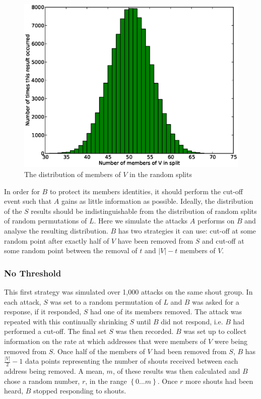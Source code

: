 \documentclass[ %
                    author={Luke Murray},
                supervisor={Dr. Simon Hollis},
                     title={Shadow Peer-to-Peer Networks},
                  subtitle={},
                    degree={MEng},
                      year={2013} ]{thesis}
\begin{document}
\begin{figure}[h]
    \centering
    \begin{minipage}[b]{0.6\linewidth}
        \centering
        \includegraphics[width=\linewidth]{diagrams/split_result.eps}
        \caption{The distribution of members of $V$ in the random splits}
    \end{minipage}
    \label{random_split_result}
\end{figure}

In order for $B$ to protect its members identities, it should perform the cut-off event such that $A$ gains as little information as possible. Ideally, the distribution of the $S$ results should be indistinguishable from the distribution of random splits of random permutations of $L$. Here we simulate the attacks $A$ performs on $B$ and analyse the resulting distribution. $B$ has two strategies it can use: cut-off at some random point after exactly half of $V$ have been removed from $S$ and cut-off at some random point between the removal of $t$ and $|V| - t$ members of $V$. 

\subsubsection{No Threshold}

This first strategy was simulated over 1,000 attacks on the same shout group. In each attack, $S$ was set to a random permutation of $L$ and $B$ was asked for a response, if it responded, $S$ had one of its members removed. The attack was repeated with this continually shrinking $S$ until $B$ did not respond, i.e. $B$ had performed a cut-off. The final set $S$ was then recorded. $B$ was set up to collect information on the rate at which addresses that were members of $V$ were being removed from $S$. Once half of the members of $V$ had been removed from $S$, $B$ has $\frac{|V|}{2} - 1$ data points representing the number of shouts received between each address being removed. A mean, $m$, of these results was then calculated and $B$ chose a random number, $r$, in the range $\left\{0 ... m\right\}$. Once $r$ more shouts had been heard, $B$ stopped responding to shouts. 
\end{document}
